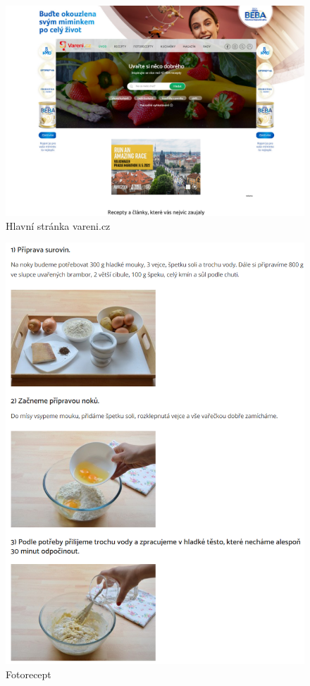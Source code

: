 \begin{figure}[H]
    \includegraphics[width=\textwidth]{images/varenicz-uvodni-stranka}
    \caption{Hlavní stránka vareni.cz} \label{picture:varenicz:uvodni-stranka}
\end{figure}
\begin{figure}[H]
    \includegraphics[width=\textwidth]{images/vareni-cz-foto-recepty}
    \caption{Fotorecept} \label{picture:varenicz:fotorecept}
\end{figure}

